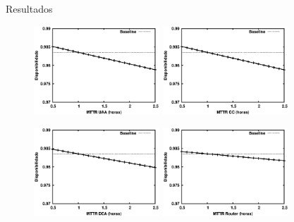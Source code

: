 \documentclass{beamer}
\begin{document}
    \begin{frame}{Resultados}

        \begin{figure}
            \centering
            {\includegraphics[width=0.42\textwidth]{img/mttr-uaa.eps}}\qquad
            {\includegraphics[width=0.42\textwidth]{img/mttr-cc.eps}}
        \end{figure}

        \begin{figure}
            \centering
            {\includegraphics[width=0.42\textwidth]{img/mttr-dea.eps}}\qquad    
            {\includegraphics[width=0.42\textwidth]{img/mttr-router.eps}}
        \end{figure}

    \end{frame}
    
\end{document}
